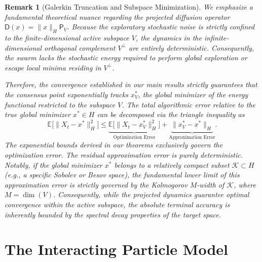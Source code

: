 \documentclass[12pt]{amsart}
\numberwithin{equation}{section}
\newtheorem{remark}[theorem]{Remark}
\begin{document}
\begin{remark}[Galerkin Truncation and Subspace Minimization]
\label{rem:subspace_minimizer}
We emphasize a fundamental theoretical nuance regarding the projected diffusion operator $\mathsf{D}(x) = \|x\|_H \mathsf{P}_V$. Because the exploratory stochastic noise is strictly confined to the finite-dimensional active subspace $V$, the dynamics in the infinite-dimensional orthogonal complement $V^\perp$ are entirely deterministic. Consequently, the swarm lacks the stochastic energy required to perform global exploration or escape local minima residing in $V^\perp$. 

Therefore, the convergence established in our main results strictly guarantees that the consensus point exponentially tracks $x_V^*$, the global minimizer of the energy functional restricted to the subspace $V$. The total algorithmic error relative to the true global minimizer $x^* \in H$ can be decomposed via the triangle inequality as
\begin{equation*}
   \mathbb{E}\big[\|X_t - x^*\|_H^2\big]\leq \underbrace{\mathbb{E}\big[\|X_t - x_V^*\|_H^2\big]}_{\text{Optimization Error}} + \underbrace{\|x_V^* - x^*\|_H}_{\text{Approximation Error}}.
\end{equation*}
The exponential bounds derived in our theorems exclusively govern the optimization error. The residual approximation error is purely deterministic. Notably, if the global minimizer $x^*$ belongs to a relatively compact subset $\mathcal{K} \subset H$ (e.g., a specific Sobolev or Besov space), the fundamental lower limit of this approximation error is strictly governed by the Kolmogorov $M$-width \cite{pinkus2012n} of $\mathcal{K}$, where $M = \dim(V)$. Consequently, while the projected dynamics guarantee optimal convergence within the active subspace, the absolute terminal accuracy is inherently bounded by the spectral decay properties of the target space.
\end{remark}



\section{The Interacting Particle Model}
\label{sec:particle}
\end{document}
